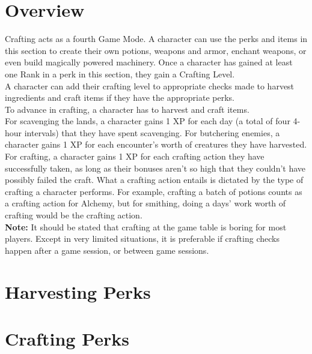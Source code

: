 \chapter{Overview}\label{ch:craftingOverview}
Crafting acts as a fourth Game Mode.
A character can use the perks and items in this section to create their own potions, weapons and armor, enchant weapons, or even build magically powered machinery.
Once a character has gained at least one Rank in a perk in this section, they gain a Crafting Level.\\
A character can add their crafting level to appropriate checks made to harvest ingredients and craft items if they have the appropriate perks.\\
To advance in crafting, a character has to harvest and craft items.\\
For scavenging the lands, a character gains 1 XP for each day (a total of four 4-hour intervals) that they have spent scavenging.
For butchering enemies, a character gains 1 XP for each encounter's worth of creatures they have harvested.\\
For crafting, a character gains 1 XP for each crafting action they have successfully taken, as long as their bonuses aren't so high that they couldn't have possibly failed the craft.
What a crafting action entails is dictated by the type of crafting a character performs.
For example, crafting a batch of potions counts as a crafting action for Alchemy, but for smithing, doing a days' work worth of crafting would be the crafting action.\\
\textbf{Note:} It should be stated that crafting at the game table is boring for most players.
Except in very limited situations, it is preferable if crafting checks happen after a game session, or between game sessions.

\chapter{Harvesting Perks}\label{ch:harvestingPerks}









\chapter{Crafting Perks}\label{ch:craftingPerks}


